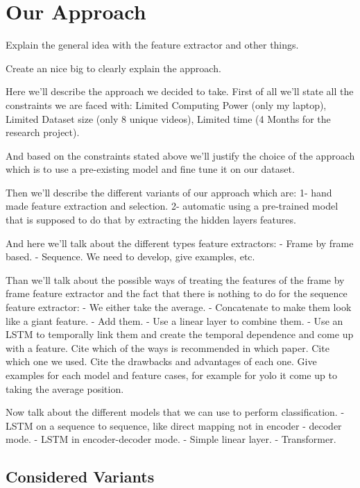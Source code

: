 \section{Our Approach}

Explain the general idea with the feature extractor and other things.

Create an nice big to clearly explain the approach.


Here we'll describe the approach we decided to take. First of all we'll state all the constraints we are faced with: Limited Computing Power (only my laptop), Limited Dataset size (only 8 unique videos), Limited time (4 Months for the research project).

And based on the constraints stated above we'll justify the choice of the approach which is to use a pre-existing model and fine tune it on our dataset.

Then we'll describe the different variants of our approach which are:
1- hand made feature extraction and selection.
2- automatic using a pre-trained model that is supposed to do that by extracting the hidden layers features.

And here we'll talk about the different types feature extractors:
- Frame by frame based.
- Sequence.
We need to develop, give examples, etc.

Than we'll talk about the possible ways of treating the features of the frame by frame feature extractor and the fact that there is nothing to do for the sequence feature extractor:
- We either take the average.
- Concatenate to make them look like a giant feature.
- Add them.
- Use a linear layer to combine them.
- Use an LSTM to temporally link them and create the temporal dependence and come up with a feature.
Cite which of the ways is recommended in which paper. Cite which one we used. Cite the drawbacks and advantages of each one.
Give examples for each model and feature cases, for example for yolo it come up to taking the average position.

Now talk about the different models that we can use to perform classification.
- LSTM on a sequence to sequence, like direct mapping not in encoder - decoder mode.
- LSTM in encoder-decoder mode.
- Simple linear layer.
- Transformer.

\subsection*{Considered Variants}

